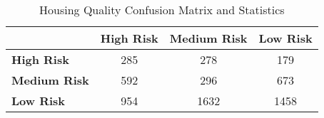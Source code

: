 \begin{table}[!htbp]
    \small
    \centering
    \caption{Housing Quality Confusion Matrix and Statistics}
    \label{tab:qual_confusion}
    \begin{tabular}{lccc}
        \toprule
        & \textbf{High Risk} & \textbf{Medium Risk} & \textbf{Low Risk} \\
        \midrule
        \textbf{High Risk} & 285 & 278 & 179 \\
        \textbf{Medium Risk} & 592 & 296 & 673 \\
        \textbf{Low Risk} & 954 & 1632 & 1458 \\
        \bottomrule

    \end{tabular}
\end{table}